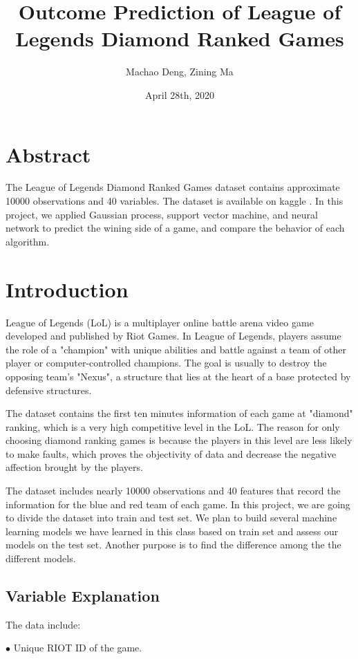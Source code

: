 \documentclass{article}
\title{Outcome Prediction of League of Legends Diamond Ranked Games}
\author{Machao Deng, Zining Ma}
\date{April 28th, 2020}
\begin{document}
\maketitle

\section{Abstract}
The League of Legends Diamond Ranked Games dataset contains approximate 10000 observations and 40 variables. The dataset is available on kaggle \cite{kaggledata}. In this project, we applied Gaussian process, support vector machine, and neural network to predict the wining side of a game, and compare the behavior of each algorithm.

\section{Introduction}
League of Legends (LoL) is a multiplayer online battle arena video game developed and published by Riot Games\cite{LOLINTRO}. In League of Legends, players assume the role of a "champion" with unique abilities and battle against a team of other player or computer-controlled champions. The goal is usually to destroy the opposing team's "Nexus", a structure that lies at the heart of a base protected by defensive structures.

The dataset contains the first ten minutes information of each game at "diamond" ranking, which is a very high competitive level in the LoL. The reason for only choosing diamond ranking games is because the players in this level are less likely to make faults, which proves the objectivity of data and decrease the negative affection brought by the players.

The dataset includes nearly 10000 observations and 40 features that record the information for the blue and red team of each game. In this project, we are going to divide the dataset into train and test set. We plan to build several machine learning models we have learned in this class based on train set and assess our models on the test set. Another purpose is to find the difference among the the different models.

\subsection{Variable Explanation}

The data include:

$\bullet$ Unique RIOT ID of the game.
\end{document}
